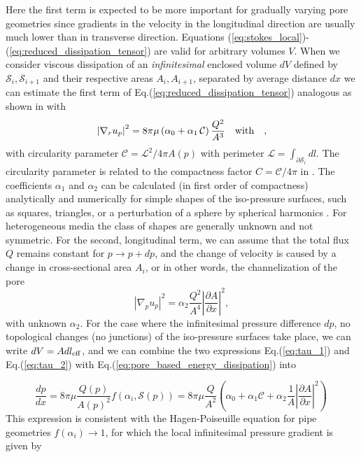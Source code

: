 \documentclass[draft]{agujournal2019}
\begin{document}
Here the first term is expected to be more important for gradually varying pore geometries since gradients in the velocity in the longitudinal direction are usually much lower than in transverse direction. Equations (\ref{eq:stokes_local})-(\ref{eq:reduced_dissipation_tensor}) are valid for arbitrary volumes $V$. When we consider viscous dissipation of an \textit{infinitesimal} enclosed volume $dV$ defined by $\mathcal{S}_i,\mathcal{S}_{i+1}$ and their respective areas $A_i, A_{i+1}$, separated by average distance $dx$ we can estimate the first term of Eq.(\ref{eq:reduced_dissipation_tensor}) analogous as shown in \cite{mortensen_reexamination_2005} with
\begin{equation}
	\left|\nabla_r u_p\right|^2 =8\pi\mu \left(\alpha_0+\alpha_1\,\mathcal{C}\right)\frac{ Q^2}{A^3}~~~ \rm{with}~~~ ,\label{eq:tau_1}
\end{equation}
with circularity parameter $\mathcal{C} = \mathcal{L}^2/4\pi A(p)$ with perimeter $\mathcal{L} = \int_{\partial \mathcal{S}_i}dl$. The circularity parameter is related to the compactness factor $C = \mathcal{C}/4\pi$ in \cite{mortensen_reexamination_2005}. The coefficients $\alpha_1$ and $\alpha_2$ can be calculated (in first order of compactness) analytically and numerically for simple shapes of the iso-pressure surfaces, such as squares, triangles, or a perturbation of a sphere by spherical harmonics . For heterogeneous media the class of shapes are generally unknown and not symmetric. 
For the second, longitudinal term, we can assume that the total flux $Q$ remains constant for $p\rightarrow p+dp$, and the change of velocity is caused by a change in cross-sectional area $A_i$, or in other words, the channelization of the pore 
\begin{equation}
	\left|\nabla_p u_p\right|^2 = \alpha_2  \frac{Q^2}{A^4}\left|\frac{\partial A}{\partial x }\right|^2,\label{eq:tau_2}
\end{equation}
with unknown $\alpha_2$. For the case where the infinitesimal pressure difference $dp$, no topological changes (no junctions) of the iso-pressure surfaces take place, we can write $dV = A dl_{\rm{eff}}$, and we can combine the two expressions Eq.(\ref{eq:tau_1}) and Eq.(\ref{eq:tau_2}) with Eq.(\ref{eq:pore_based_energy_dissipation}) into

\begin{equation}
	\frac{dp}{dx} = 8\pi \mu \frac{Q(p)}{A(p)^2} f\left(\alpha_i,\mathcal{S}(p) \right) = 8 \pi \mu\frac{Q}{A^2}\left(\alpha_0+\alpha_1\mathcal{C} + \alpha_2 \frac{1}{A}\left|\frac{\partial A}{\partial x}\right|^2\right)\,\label{eq:infi_dp}
\end{equation}
This expression is consistent with the Hagen-Poiseuille equation for pipe geometries $f(\alpha_i)\rightarrow 1$, for which the local infinitesimal pressure gradient is given by 
\end{document}
